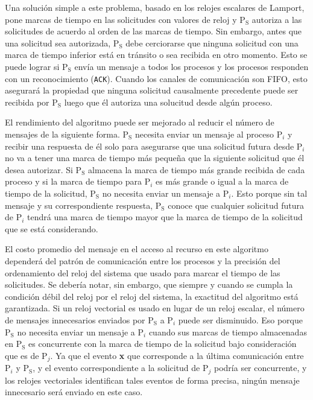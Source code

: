 \documentclass[12pt, times]{simauth}
\begin{document}
Una solución simple a este problema, basado en los relojes escalares de Lamport, pone marcas de tiempo en las solicitudes con valores de reloj y P$_{\text{S}}$ autoriza a las solicitudes de acuerdo al orden de las marcas de tiempo. Sin embargo, antes que una solicitud sea autorizada, P$_{\text{S}}$ debe cerciorarse que ninguna solicitud con una marca de tiempo inferior está en tránsito o sea recibida en otro momento. Esto se puede lograr si P$_{\text{S}}$ envía un mensaje a todos los procesos y los procesos responden con un reconocimiento (\texttt{ACK}). Cuando los canales de comunicación son FIFO, esto asegurará la propiedad que ninguna solicitud causalmente precedente puede ser recibida por P$_{\text{S}}$ luego que él autoriza una solucitud desde algún proceso.

El rendimiento del algoritmo puede ser mejorado al reducir el número de mensajes de la siguiente forma. P$_{\text{S}}$ necesita enviar un mensaje al proceso P$_i$ y recibir una respuesta de él solo para asegurarse que una solicitud futura desde P$_i$ no va a tener una marca de tiempo más pequeña que la siguiente solicitud que él desea autorizar. Si P$_{\text{S}}$ almacena la marca de tiempo más grande recibida de cada proceso y si la marca de tiempo para P$_i$ es más grande o igual a la marca de tiempo de la solicitud, P$_{\text{S}}$ no necesita enviar un mensaje a P$_i$. Esto porque sin tal mensaje y su correspondiente respuesta, P$_{\text{S}}$ conoce que cualquier solicitud futura de P$_i$ tendrá una marca de tiempo mayor que la marca de tiempo de la solicitud que se está considerando.

El costo promedio del mensaje en el acceso al recurso en este algoritmo dependerá del patrón de comunicación entre los procesos y la precisión del ordenamiento del reloj del sistema que usado para marcar el tiempo de las solicitudes. Se debería notar, sin embargo, que siempre y cuando se cumpla la condición débil del reloj por el reloj del sistema, la exactitud del algoritmo está garantizada. Si un reloj vectorial es usado en lugar de un reloj escalar, el número de mensajes innecesarios enviados por P$_{\text{S}}$ a P$_i$ puede ser disminuido. Eso porque P$_{\text{S}}$ no necesita enviar un mensaje a P$_i$ cuando sus marcas de tiempo almacenadas en P$_{\text{S}}$ es concurrente con la marca de tiempo de la solicitud bajo consideración que es de P$_j$. Ya que el evento \textbf{x} que corresponde a la última comunicación entre P$_i$ y P$_{\text{S}}$, y el evento correspondiente a la solicitud de P$_j$ podría ser concurrente, y los relojes vectoriales identifican tales eventos de forma precisa, ningún mensaje innecesario será enviado en este caso. 
\end{document}
